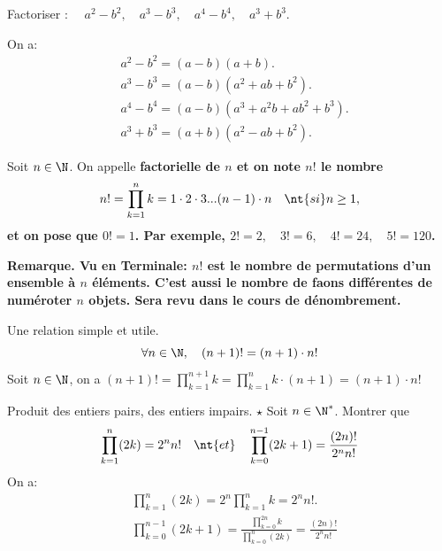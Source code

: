 \documentclass[11pt]{article}
\begin{document}
\begin{ex}{}{}
    \begin{center}
        Factoriser : $\quad a^2-b^2,\quad a^3-b^3,\quad a^4-b^4,\quad a^3+b^3$.
    \end{center}
    \tcblower
    On a:
    \begin{align*}
        &a^2-b^2=(a-b)(a+b).\\
        &a^3-b^3=(a-b)(a^2+ab+b^2).\\
        &a^4-b^4=(a-b)(a^3+a^2b+ab^2+b^3).\\
        &a^3+b^3=(a+b)(a^2-ab+b^2).
    \end{align*}
\end{ex}

\begin{defi}{}{}
    Soit $n\in\N$. On appelle \bf{factorielle} de $n$ et on note $n!$ le nombre
    \begin{equation*}
        n!=\prod_{k=1}^nk=1\cdot2\cdot3...(n-1)\cdot n \quad\nt{si }n\geq1,
    \end{equation*}
    et on pose que $0!=1$. Par exemple, $2!=2,\quad3!=6,\quad4!=24,\quad5!=120$.
\end{defi}

\bf{Remarque.} Vu en Terminale: $n!$ est le nombre de permutations d'un ensemble à $n$ éléments. C'est aussi le nombre de faons différentes de numéroter $n$ objets. Sera revu dans le cours de dénombrement.

\begin{prop}{Une relation simple et utile.}{}
    \begin{equation*}
        \forall n \in \N, \quad (n+1)! = (n+1)\cdot n!
    \end{equation*}
    \tcblower
    Soit $n\in\N$, on a $(n+1)!=\prod_{k=1}^{n+1}k=\prod_{k=1}^nk\cdot(n+1)=(n+1)\cdot n!$
\end{prop}

\begin{ex}{Produit des entiers pairs, des entiers impairs. $\star$}{}
    Soit $n\in\N^*$. Montrer que
    \begin{equation*}
        \prod_{k=1}^n(2k)=2^nn!\quad\nt{et}\quad\prod_{k=0}^{n-1}(2k+1)=\frac{(2n)!}{2^nn!}
    \end{equation*}
    \tcblower
    On a:
    \begin{align*}
        &\prod_{k=1}^n(2k)=2^n\prod_{k=1}^nk=2^nn!.\\
        &\prod_{k=0}^{n-1}(2k+1)=\frac{\prod_{k=0}^{2n}k}{\prod_{k=0}^n(2k)}=\frac{(2n)!}{2^nn!}
    \end{align*}
\end{ex}
\end{document}
